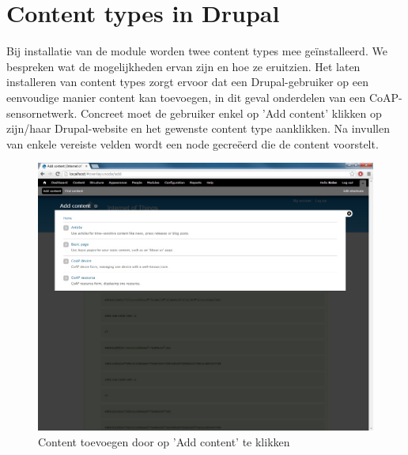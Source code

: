 \section{Content types in Drupal}

Bij installatie van de module worden twee content types mee ge\"{i}nstalleerd. We bespreken wat de mogelijkheden ervan zijn en hoe ze eruitzien. Het laten installeren van content types zorgt ervoor dat een Drupal-gebruiker op een eenvoudige manier content kan toevoegen, in dit geval onderdelen van een CoAP-sensornetwerk. Concreet moet de gebruiker enkel op 'Add content' klikken op zijn/haar Drupal-website en het gewenste content type aanklikken. Na invullen van enkele vereiste velden wordt een node gecre\"{e}erd die de content voorstelt.
\begin{figure}[h!]
\vspace{10pt}
\centering
\includegraphics[width=1\textwidth]{fig/add_content}
\caption{Content toevoegen door op 'Add content' te klikken}
\label{fig:addContent}
\end{figure}

